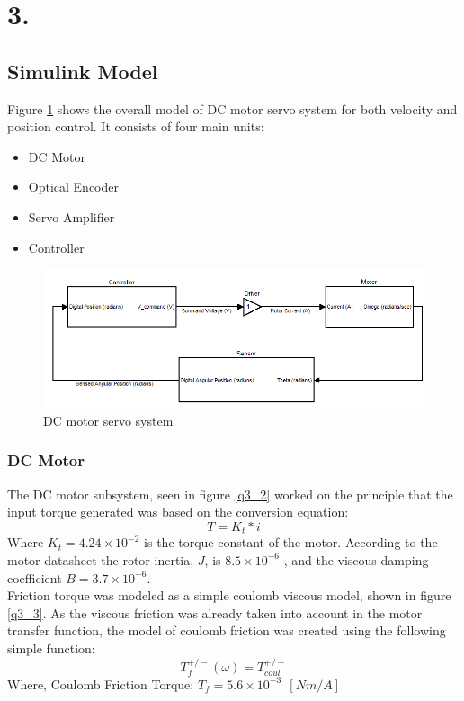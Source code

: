 \documentclass{article}
\theoremstyle{plain}
\theoremstyle{definition}
\theoremstyle{remark}
\begin{document}
\clearpage

\section*{3.}
\subsection*{Simulink Model}
Figure \ref{q3_1} shows the overall model of DC motor servo system for both velocity and position control. It consists of four main units: 
\begin{itemize}
\item DC Motor
\item Optical Encoder 
\item Servo Amplifier 
\item Controller
\end{itemize}

\begin{figure}[htb]
\begin{center}
\includegraphics[width = 14cm]{q3_1}
\caption{DC motor servo system}
\label{q3_1}
\end{center}
\end{figure}

\clearpage

\subsubsection*{DC Motor}
The DC motor subsystem, seen in figure \ref{q3_2} worked on the principle that the input torque generated was based on the conversion equation: 
$$T = K_t*i$$
Where $K_t = 4.24\times10^{-2}$  is the torque constant of the motor. According to the motor datasheet the rotor inertia, $J$, is $8.5 \times 10^{-6}$ , and the viscous damping coefficient $B =3.7\times10^{-6}$.\\

Friction torque was modeled as a simple coulomb viscous model, shown in figure \ref{q3_3}. As the viscous friction was already taken into account in the motor transfer function, the model of coulomb friction was created using the following simple function: 
$$T_f^{+/-} (\omega) =T_{coul}^{+/-}$$
Where,  Coulomb Friction Torque: $ T_f = 5.6\times 10^{-3} \ \  [Nm/A]$
\end{document}
